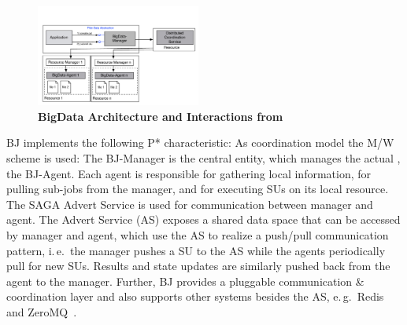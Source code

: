 \documentclass[conference]{IEEEtran}
\begin{document}
\begin{figure}[t]
	\up\upp
	\centering
	\includegraphics[width=0.48\textwidth]{../figures/bigdata_pmr.pdf}
	\caption{\textbf{BigData Architecture and Interactions from ~\cite{pmr2012}}}
	\label{fig:bigdata}
\end{figure}


BJ implements the following P* characteristic: As coordination model the M/W
scheme is used: The BJ-Manager is the central entity, which manages the actual
\pilot, the BJ-Agent. Each agent is responsible for gathering local
information, for pulling sub-jobs from the manager, and for executing SUs on
its local resource. The SAGA Advert Service is used for communication between
manager and agent. The Advert Service (AS) exposes a shared data space that
can be accessed by manager and agent, which use the AS to realize a push/pull
communication pattern, i.\,e.\ the manager pushes a SU to the AS while the
agents periodically pull for new SUs. Results and state updates are similarly
pushed back from the agent to the manager. Further, BJ provides a pluggable
communication \& coordination layer and also supports other \cc systems
besides the AS, e.\,g.\ Redis~\cite{redis} and ZeroMQ~\cite{zmq}.



% 
\end{document}
